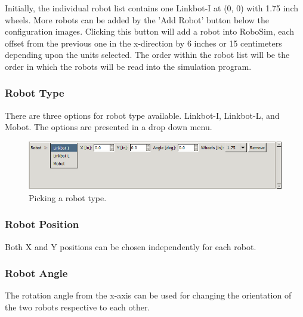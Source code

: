 \documentclass{article}
\begin{document}
Initially, the individual robot list contains one Linkbot-I at (0, 0) with 1.75
inch wheels.  More robots can be added by the 'Add Robot' button below the
configuration images.  Clicking this button will add a robot into RoboSim, each
offset from the previous one in the x-direction by 6 inches or 15 centimeters
depending upon the units selected.  The order within the robot list will be the
order in which the robots will be read into the simulation program.

\subsubsection{Robot Type}
There are three options for robot type available.  Linkbot-I, Linkbot-L,
and Mobot.  The options are presented in a drop down menu.
\begin{figure}[H]
	\begin{center}
		\includegraphics[width=6in]{images/gui_type}
	\end{center}
	\caption{Picking a robot type.}
	\label{fig:type}
\end{figure}

\subsubsection{Robot Position}
Both X and Y positions can be chosen independently for each robot.

\subsubsection{Robot Angle}
The rotation angle from the x-axis can be used for changing the orientation of
the two robots respective to each other. 
\end{document}
